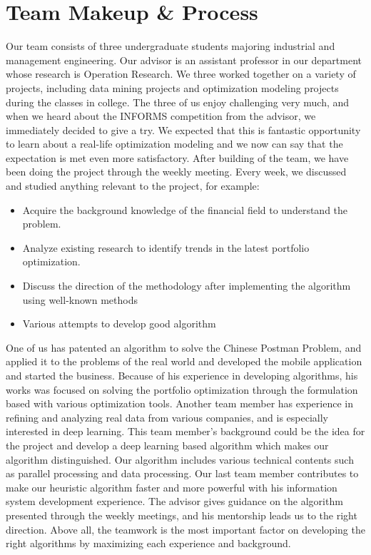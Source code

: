 \documentclass[11pt]{article}
\begin{document}
	
	
	
	\section*{Team Makeup {\&} Process}
	
	Our team consists of three undergraduate students majoring industrial and management engineering. Our advisor is an assistant professor in our department whose research is Operation Research. We three worked together on a variety of projects, including data mining projects and optimization modeling projects during the classes in college. The three of us enjoy challenging very much, and when we heard about the INFORMS competition from the advisor, we immediately decided to give a try. We expected that this is fantastic opportunity to learn about a real-life optimization modeling and we now can say that the expectation is met even more satisfactory.
	After building of the team, we have been doing the project through the weekly meeting. Every week, we discussed and studied anything relevant to the project, for example:
	\begin{itemize} 
		\item Acquire the background knowledge of the financial field to understand the problem.
		\item Analyze existing research to identify trends in the latest portfolio optimization.
		\item Discuss the direction of the methodology after implementing the algorithm using well-known methods
		\item Various attempts to develop good algorithm 
	\end{itemize}
	
	One of us has patented an algorithm to solve the Chinese Postman Problem, and applied it to the problems of the real world and developed the mobile application and started the business. Because of his experience in developing algorithms, his works was focused on solving the portfolio optimization through the formulation based with various optimization tools. Another team member has experience in refining and analyzing real data from various companies, and is especially interested in deep learning. This team member's background could be the idea for the project and develop a deep learning based algorithm which makes our algorithm distinguished. Our algorithm includes various technical contents such as parallel processing and data processing. Our last team member contributes to make our heuristic algorithm faster and more powerful with his information system development experience. The advisor gives guidance on the algorithm presented through the weekly meetings, and his mentorship leads us to the right direction. Above all, the teamwork is the most important factor on developing the right algorithms by maximizing each experience and background. 
	
\end{document}
